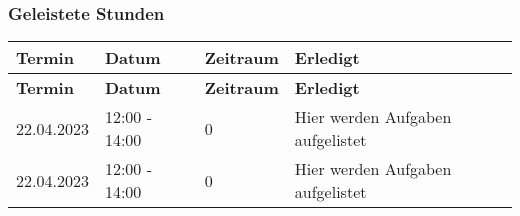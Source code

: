 \subsubsection{Geleistete Stunden}
\begin{flushleft}
		\begin{longtable}{p{2cm}p{}p{2cm}p{}}
            \toprule
            \textbf{Termin} & \textbf{Datum} & \textbf{Zeitraum} & \textbf{Erledigt}\\
            \midrule\endfirsthead
            \toprule
            \textbf{Termin} & \textbf{Datum} & \textbf{Zeitraum} & \textbf{Erledigt}\\
            \midrule\endhead
            	22.04.2023 & 12:00 - 14:00 & 0 & Hier werden Aufgaben aufgelistet \\ \midrule
				22.04.2023 & 12:00 - 14:00 & 0 & Hier werden Aufgaben aufgelistet \\ 
            \bottomrule
    \end{longtable}
\end{flushleft}